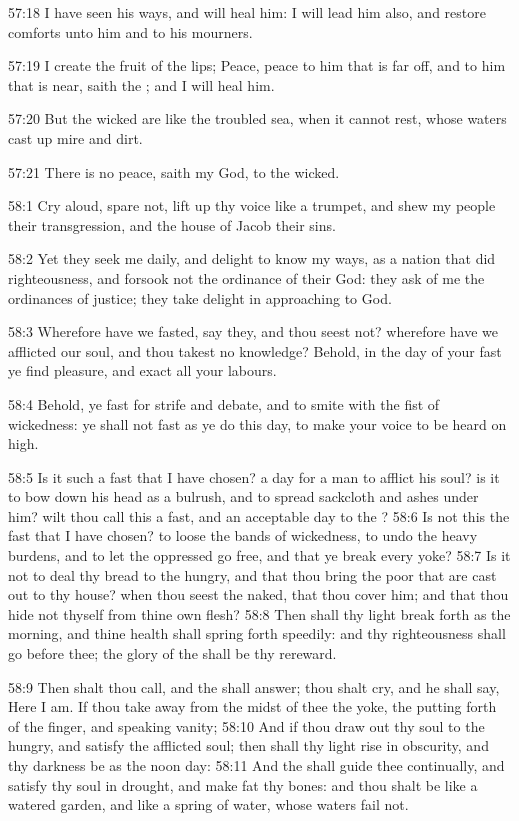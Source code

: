57:18 I have seen his ways, and will heal him: I will lead him also, and restore comforts unto him and to his mourners.

57:19 I create the fruit of the lips; Peace, peace to him that is far off, and to him that is near, saith the \LORD; and I will heal him.

57:20 But the wicked are like the troubled sea, when it cannot rest, whose waters cast up mire and dirt.

57:21 There is no peace, saith my God, to the wicked.

58:1 Cry aloud, spare not, lift up thy voice like a trumpet, and shew my people their transgression, and the house of Jacob their sins.

58:2 Yet they seek me daily, and delight to know my ways, as a nation that did righteousness, and forsook not the ordinance of their God: they ask of me the ordinances of justice; they take delight in approaching to God.

58:3 Wherefore have we fasted, say they, and thou seest not? wherefore have we afflicted our soul, and thou takest no knowledge? Behold, in the day of your fast ye find pleasure, and exact all your labours.

58:4 Behold, ye fast for strife and debate, and to smite with the fist of wickedness: ye shall not fast as ye do this day, to make your voice to be heard on high.

58:5 Is it such a fast that I have chosen? a day for a man to afflict his soul? is it to bow down his head as a bulrush, and to spread sackcloth and ashes under him? wilt thou call this a fast, and an acceptable day to the \LORD?  58:6 Is not this the fast that I have chosen? to loose the bands of wickedness, to undo the heavy burdens, and to let the oppressed go free, and that ye break every yoke?  58:7 Is it not to deal thy bread to the hungry, and that thou bring the poor that are cast out to thy house? when thou seest the naked, that thou cover him; and that thou hide not thyself from thine own flesh?  58:8 Then shall thy light break forth as the morning, and thine health shall spring forth speedily: and thy righteousness shall go before thee; the glory of the \LORD shall be thy rereward.

58:9 Then shalt thou call, and the \LORD shall answer; thou shalt cry, and he shall say, Here I am. If thou take away from the midst of thee the yoke, the putting forth of the finger, and speaking vanity; 58:10 And if thou draw out thy soul to the hungry, and satisfy the afflicted soul; then shall thy light rise in obscurity, and thy darkness be as the noon day: 58:11 And the \LORD shall guide thee continually, and satisfy thy soul in drought, and make fat thy bones: and thou shalt be like a watered garden, and like a spring of water, whose waters fail not.

